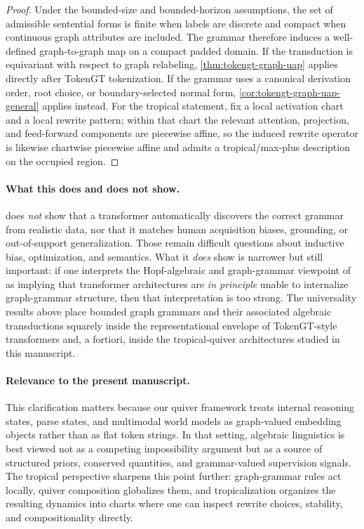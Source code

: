 \documentclass[11pt]{article}
\theoremstyle{definition}
\theoremstyle{plain}
\theoremstyle{remark}
\begin{document}
\begin{proof}
Under the bounded-size and bounded-horizon assumptions, the set of admissible sentential forms is finite when labels are discrete and compact when continuous graph attributes are included.
The grammar therefore induces a well-defined graph-to-graph map on a compact padded domain.
If the transduction is equivariant with respect to graph relabeling, \cref{thm:tokengt-graph-uap} applies directly after TokenGT tokenization.
If the grammar uses a canonical derivation order, root choice, or boundary-selected normal form, \cref{cor:tokengt-graph-uap-general} applies instead.
For the tropical statement, fix a local activation chart and a local rewrite pattern; within that chart the relevant attention, projection, and feed-forward components are piecewise affine, so the induced rewrite operator is likewise chartwise piecewise affine and admits a tropical/max-plus description on the occupied region.
\end{proof}

\paragraph{What this does and does not show.}
 does \emph{not} show that a transformer automatically discovers the correct grammar from realistic data, nor that it matches human acquisition biases, grounding, or out-of-support generalization.
Those remain difficult questions about inductive bias, optimization, and semantics.
What it \emph{does} show is narrower but still important:
if one interprets the Hopf-algebraic and graph-grammar viewpoint of \cite{MarcolliChomskyBerwickMerge2023,MarcolliBerwickChomskyMinimalism2023,MarcolliBerwickChomskySyntaxSemantics2023} as implying that transformer architectures are \emph{in principle} unable to internalize graph-grammar structure, then that interpretation is too strong.
The universality results above place bounded graph grammars and their associated algebraic transductions squarely inside the representational envelope of TokenGT-style transformers and, a fortiori, inside the tropical-quiver architectures studied in this manuscript.

\paragraph{Relevance to the present manuscript.}
This clarification matters because our quiver framework treats internal reasoning states, parse states, and multimodal world models as graph-valued embedding objects rather than as flat token strings.
In that setting, algebraic linguistics is best viewed not as a competing impossibility argument but as a source of structured priors, conserved quantities, and grammar-valued supervision signals.
The tropical perspective sharpens this point further:
graph-grammar rules act locally, quiver composition globalizes them, and tropicalization organizes the resulting dynamics into charts where one can inspect rewrite choices, stability, and compositionality directly.
\end{document}
